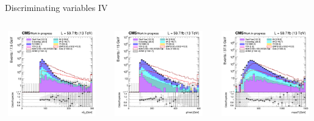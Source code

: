 \documentclass[8pt]{beamer}
\begin{document}
\begin{frame}{Discriminating variables IV}
\begin{columns}
\begin{column}{1.09\textwidth}
\begin{block}{}\end{block} \vspace{5pt}
\end{column}
\end{columns} \vspace{-5pt}
\begin{columns}
		\begin{column}{0.33\textwidth}
			\begin{center}
     			\includegraphics[width=1.0\textwidth, height=105pt]{figs/2018/SmearSR-ttDM-scalar100/log_cratio_topCR_ll_mt2ll.png}
    		\end{center}		
		\end{column} 
		\begin{column}{0.33\textwidth}
			\begin{center}
     			\includegraphics[width=1.0\textwidth, height=105pt]{figs/2018/SmearSR-ttDM-scalar100/log_cratio_topCR_ll_METcorrected_pt.png}
    		\end{center}		
		\end{column} 
		\begin{column}{0.33\textwidth}
			\begin{center}
     			\includegraphics[width=1.0\textwidth, height=105pt]{figs/2018/SmearSR-ttDM-scalar100/log_cratio_topCR_ll_massT.png}

\end{center}
\end{column}
\end{columns}
\end{frame}
\end{document}

